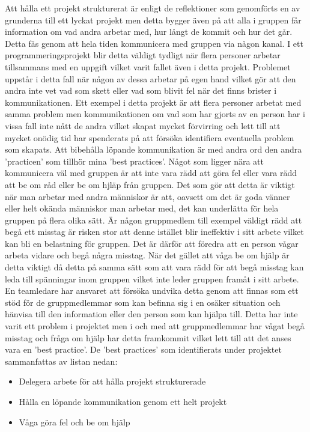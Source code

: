 Att hålla ett projekt strukturerat är enligt de reflektioner som genomförts en av grunderna till ett lyckat projekt men detta bygger även på att alla i gruppen får information om vad andra arbetar med, hur långt de kommit och hur det går. Detta fås genom att hela tiden kommunicera med gruppen via någon kanal. I ett programmeringsprojekt blir detta väldigt tydligt när flera personer arbetar tillsammans med en uppgift vilket varit fallet även i detta projekt. Problemet uppstår i detta fall när någon av dessa arbetar på egen hand vilket gör att den andra inte vet vad som skett eller vad som blivit fel när det finns brister i kommunikationen. Ett exempel i detta projekt är att flera personer arbetat med samma problem men kommunikationen om vad som har gjorts av en person har i vissa fall inte nått de andra vilket skapat mycket förvirring och lett till att mycket onödig tid har spenderats på att försöka identifiera eventuella problem som skapats. Att bibehålla löpande kommunikation är med andra ord den andra 'practicen' som tillhör mina 'best practices'.
\newline \newline
Något som ligger nära att kommunicera väl med gruppen är att inte vara rädd att göra fel eller vara rädd att be om råd eller be om hjläp från gruppen. Det som gör att detta är viktigt när man arbetar med andra människor är att, oavsett om det är goda vänner eller helt okända människor man arbetar med, det kan underlätta för hela gruppen på flera olika sätt. Är någon gruppmedlem till exempel väldigt rädd att begå ett misstag är risken stor att denne istället blir ineffektiv i sitt arbete vilket kan bli en belastning för gruppen. Det är därför att föredra att en person vågar arbeta vidare och begå några misstag. När det gället att våga be om hjälp är detta viktigt då detta på samma sätt som att vara rädd för att begå misstag kan leda till spänningar inom gruppen vilket inte leder gruppen framåt i sitt arbete. En teamledare har ansvaret att försöka undvika detta genom att finnas som ett stöd för de gruppmedlemmar som kan befinna sig i en osäker situation och hänvisa till den information eller den person som kan hjälpa till. Detta har inte varit ett problem i projektet men i och med att gruppmedlemmar har vågat begå misstag och fråga om hjälp har detta framkommit vilket lett till att det anses vara en 'best practice'.
\newline \newline
De 'best practices' som identifierats under projektet sammanfattas av listan nedan:
\begin{itemize}
	\item Delegera arbete för att hålla projekt strukturerade
	\item Hålla en löpande kommunikation genom ett helt projekt
	\item Våga göra fel och be om hjälp
\end{itemize}
